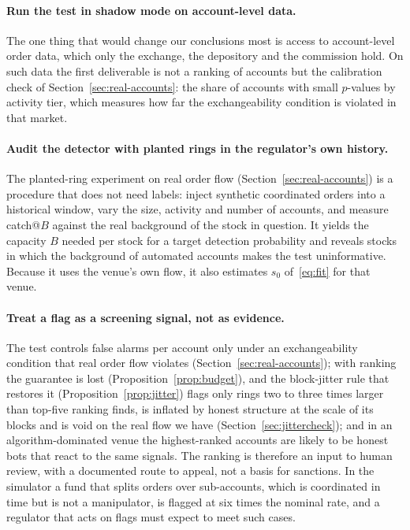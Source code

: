 \paragraph{Run the test in shadow mode on account-level data.} The one thing that would change our conclusions most is access to account-level order data, which only the exchange, the depository and the commission hold. On such data the first deliverable is not a ranking of accounts but the calibration check of Section~\ref{sec:real-accounts}: the share of accounts with small $p$-values by activity tier, which measures how far the exchangeability condition is violated in that market.

\paragraph{Audit the detector with planted rings in the regulator's own history.} The planted-ring experiment on real order flow (Section~\ref{sec:real-accounts}) is a procedure that does not need labels: inject synthetic coordinated orders into a historical window, vary the size, activity and number of accounts, and measure catch@$B$ against the real background of the stock in question. It yields the capacity $B$ needed per stock for a target detection probability and reveals stocks in which the background of automated accounts makes the test uninformative. Because it uses the venue's own flow, it also estimates $s_0$ of~\eqref{eq:fit} for that venue.

\paragraph{Treat a flag as a screening signal, not as evidence.} The test controls false alarms per account only under an exchangeability condition that real order flow violates (Section~\ref{sec:real-accounts}); with ranking the guarantee is lost (Proposition~\ref{prop:budget}), and the block-jitter rule that restores it (Proposition~\ref{prop:jitter}) flags only rings two to three times larger than top-five ranking finds, is inflated by honest structure at the scale of its blocks and is void on the real flow we have (Section~\ref{sec:jittercheck}); and in an algorithm-dominated venue the highest-ranked accounts are likely to be honest bots that react to the same signals. The ranking is therefore an input to human review, with a documented route to appeal, not a basis for sanctions. In the simulator a fund that splits orders over sub-accounts, which is coordinated in time but is not a manipulator, is flagged at six times the nominal rate, and a regulator that acts on flags must expect to meet such cases.

